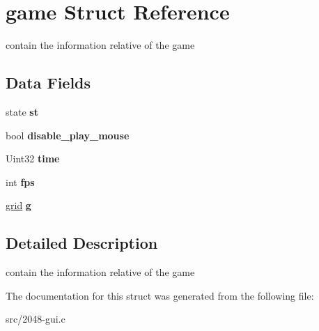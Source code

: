 \hypertarget{structgame}{\section{game Struct Reference}
\label{structgame}
}


contain the information relative of the game  


\subsection*{Data Fields}
\begin{DoxyCompactItemize}
\item 
\hypertarget{structgame_a60c994e03ddcb50275031e127be48675}{state {\bfseries st}}\label{structgame_a60c994e03ddcb50275031e127be48675}

\item 
\hypertarget{structgame_ac84c9666de32e42c128c981417944fad}{bool {\bfseries disable\-\_\-play\-\_\-mouse}}\label{structgame_ac84c9666de32e42c128c981417944fad}

\item 
\hypertarget{structgame_a7f6e6557db254e1b678dfd614a9d76e6}{Uint32 {\bfseries time}}\label{structgame_a7f6e6557db254e1b678dfd614a9d76e6}

\item 
\hypertarget{structgame_a45b67662d620a977a2cfe519f7ab6273}{int {\bfseries fps}}\label{structgame_a45b67662d620a977a2cfe519f7ab6273}

\item 
\hypertarget{structgame_ae20731f42f06e1ac0d7a3a35e7126a46}{\hyperlink{grid_8h_a1de57b3be5a7cf6542078fcb2fd1e042}{grid} {\bfseries g}}\label{structgame_ae20731f42f06e1ac0d7a3a35e7126a46}

\end{DoxyCompactItemize}


\subsection{Detailed Description}
contain the information relative of the game 

The documentation for this struct was generated from the following file\-:\begin{DoxyCompactItemize}
\item 
src/2048-\/gui.\-c\end{DoxyCompactItemize}
